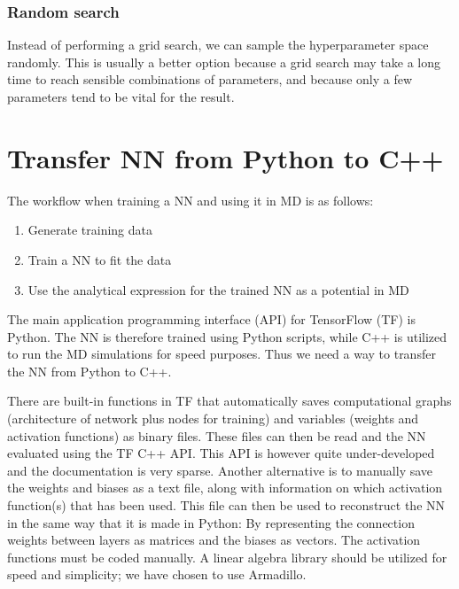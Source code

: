 \documentclass[twoside,english]{uiofysmaster}
\begin{document}
\subsubsection{Random search}
Instead of performing a grid search, we can sample the hyperparameter space randomly. This is usually a better option because 
a grid search may take a long time to reach sensible combinations of parameters, and because only a few parameters
tend to be vital for the result. 




\section{Transfer NN from Python to C++} \label{sec:timeUsage}
The workflow when training a NN and using it in MD is as follows: 
\begin{enumerate}
 \item Generate training data
 \item Train a NN to fit the data
 \item Use the analytical expression for the trained NN as a potential in MD
\end{enumerate}
The main application programming interface (API) for TensorFlow (TF) is Python. The NN is therefore
trained using Python scripts, while C++ is utilized to run the MD simulations for speed purposes. Thus
we need a way to transfer the NN from Python to C++. 

There are built-in functions in TF that automatically saves computational graphs (architecture of network plus
nodes for training) and variables (weights and activation functions) as binary files.
These files can then be read and the NN evaluated using the TF C++ API. This API is however quite under-developed
and the documentation is very sparse. Another alternative is to manually save the weights and biases
as a text file, along with information on which activation function(s) that has been used. This file 
can then be used to reconstruct the NN in the same way that it is made in Python: By representing
the connection weights between layers as matrices and the biases as vectors. The activation functions
must be coded manually. A linear algebra library should
be utilized for speed and simplicity; we have chosen to use Armadillo. 
\end{document}

